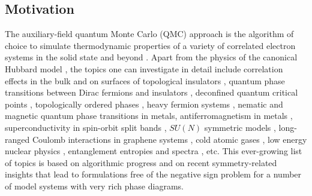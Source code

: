 
\subsection{Motivation}

The auxiliary-field quantum Monte Carlo (QMC) approach is the algorithm of choice to simulate  thermodynamic properties of a variety of correlated electron systems in the solid state and beyond \cite{Blankenbecler81,White89,Sugiyama86,Sorella89, Duane87, Assaad08_rev}.  
Apart from the physics of the  canonical Hubbard model 
\cite{Scalapino07,LeBlanc15},   the topics one can investigate in detail include correlation effects in the bulk and on surfaces of topological insulators \cite{Hohenadler10,Zheng11}, quantum phase transitions between  Dirac fermions  and insulators \cite{Assaad13,Toldin14,Otsuka16,Chandrasekharan13,Chandrasekharan15},  
deconfined quantum critical points \cite{Li15a,Assaad16}, topologically ordered phases \cite{Assaad16}, heavy fermion systems \cite{Assaad99a,Capponi00}, nematic \cite{Schattner15} and magnetic  \cite{Xu16b} quantum phase transitions in metals, antiferromagnetism in metals \cite{Berg12},    superconductivity in spin-orbit split bands \cite{Tang14_1}, $SU(N)$ symmetric models \cite{Assaad04,Lang13},  long-ranged Coulomb interactions in graphene systems \cite{Hohenadler14,Tang15},  cold atomic gases  \cite{Rigol03},  low energy nuclear physics \cite{Lee09},  entanglement entropies and spectra \cite{Grover13,Broecker14,Assaad13a,Assaad15},  etc. 
This ever-growing list of topics is based on algorithmic progress and on recent symmetry-related insights  \cite{Wu04,Huffman14,Yao14a,Wei16} that lead to formulations free of the negative sign problem for a number of model systems with very rich phase diagrams.

